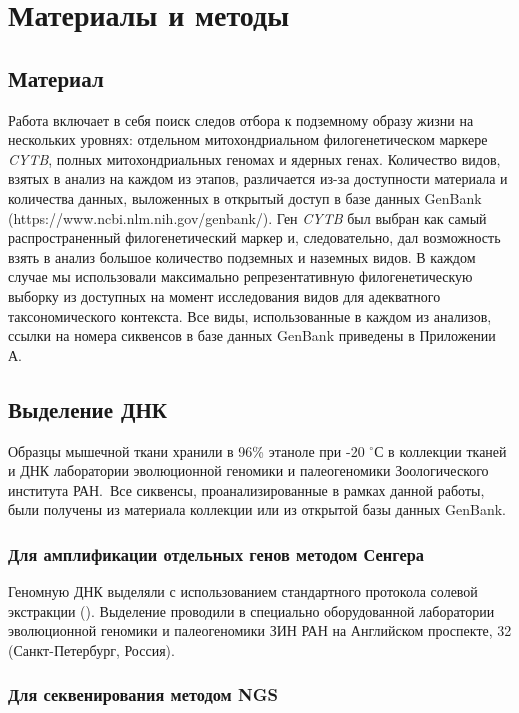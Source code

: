 \chapter{Материалы и методы} \label{mm}

\section{Материал}

Работа включает в себя поиск следов отбора к подземному образу жизни на нескольких уровнях: отдельном митохондриальном филогенетическом маркере \textit{CYTB}, полных митохондриальных геномах и ядерных генах. Количество видов, взятых в анализ на каждом из этапов, различается из-за доступности материала и количества данных, выложенных в открытый доступ в базе данных GenBank (https://www.ncbi.nlm.nih.gov/genbank/). Ген \textit{CYTB} был выбран как самый распространенный филогенетический маркер и, следовательно, дал возможность взять в анализ большое количество подземных и наземных видов.
В каждом случае мы использовали максимально репрезентативную филогенетическую выборку из доступных на момент исследования видов для адекватного таксономического контекста. Все виды, использованные в каждом из анализов, ссылки на номера сиквенсов в базе данных GenBank приведены в Приложении А. 

\section{Выделение ДНК}

Образцы мышечной ткани хранили в 96\% этаноле при -20 $^\circ$С в коллекции тканей и ДНК лаборатории эволюционной геномики и палеогеномики Зоологического института РАН. Все сиквенсы, проанализированные в рамках данной работы, были получены из материала коллекции или из открытой базы данных GenBank.

\subsection{Для амплификации отдельных генов методом Сенгера}

Геномную ДНК выделяли с использованием стандартного протокола солевой экстракции (\cite{Miller1999}). Выделение проводили в специально оборудованной лаборатории эволюционной геномики и палеогеномики ЗИН РАН на Английском проспекте, 32 (Санкт-Петербург, Россия).

\subsection{Для секвенирования методом NGS}

